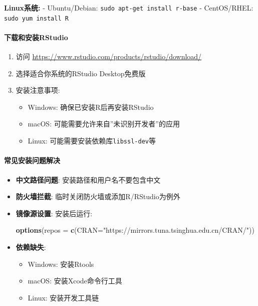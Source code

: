 \documentclass[
]{book}
\newenvironment{Shaded}{\begin{snugshade}}{\end{snugshade}}
\newcommand{\AttributeTok}[1]{\textcolor[rgb]{0.13,0.29,0.53}{#1}}
\newcommand{\FunctionTok}[1]{\textcolor[rgb]{0.13,0.29,0.53}{\textbf{#1}}}
\newcommand{\NormalTok}[1]{#1}
\newcommand{\StringTok}[1]{\textcolor[rgb]{0.31,0.60,0.02}{#1}}
\providecommand{\tightlist}{%
  \setlength{\itemsep}{0pt}\setlength{\parskip}{0pt}}
\begin{document}
\textbf{Linux系统:}
- Ubuntu/Debian: \texttt{sudo\ apt-get\ install\ r-base}
- CentOS/RHEL: \texttt{sudo\ yum\ install\ R}

\hypertarget{ux4e0bux8f7dux548cux5b89ux88c5rstudio}{%
\paragraph{下载和安装RStudio}\label{ux4e0bux8f7dux548cux5b89ux88c5rstudio}}

\begin{enumerate}
\def\labelenumi{\arabic{enumi}.}
\item
  访问 \url{https://www.rstudio.com/products/rstudio/download/}
\item
  选择适合你系统的RStudio Desktop免费版
\item
  安装注意事项:

  \begin{itemize}
  \tightlist
  \item
    Windows: 确保已安装R后再安装RStudio
  \item
    macOS: 可能需要允许来自''未识别开发者''的应用
  \item
    Linux: 可能需要安装依赖库\texttt{libssl-dev}等
  \end{itemize}
\end{enumerate}

\hypertarget{ux5e38ux89c1ux5b89ux88c5ux95eeux9898ux89e3ux51b3}{%
\paragraph{常见安装问题解决}\label{ux5e38ux89c1ux5b89ux88c5ux95eeux9898ux89e3ux51b3}}

\begin{itemize}
\item
  \textbf{中文路径问题}: 安装路径和用户名不要包含中文
\item
  \textbf{防火墙拦截}: 临时关闭防火墙或添加R/RStudio为例外
\item
  \textbf{镜像源设置}: 安装后运行:

\begin{Shaded}
\begin{Highlighting}[]
\FunctionTok{options}\NormalTok{(}\AttributeTok{repos =} \FunctionTok{c}\NormalTok{(}\AttributeTok{CRAN=}\StringTok{"https://mirrors.tuna.tsinghua.edu.cn/CRAN/"}\NormalTok{))}
\end{Highlighting}
\end{Shaded}
\item
  \textbf{依赖缺失}:

  \begin{itemize}
  \tightlist
  \item
    Windows: 安装Rtools
  \item
    macOS: 安装Xcode命令行工具
  \item
    Linux: 安装开发工具链
  \end{itemize}
\end{itemize}
\end{document}
